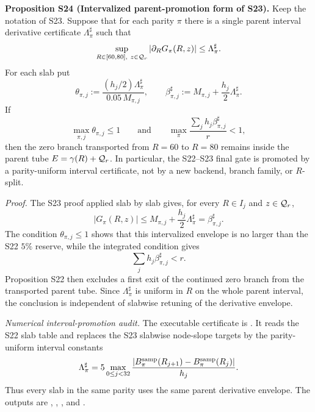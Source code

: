 \documentclass[aps,prd,onecolumn,notitlepage,nofootinbib,superscriptaddress,11pt,floatfix]{revtex4-2}
\begin{document}
\medskip\noindent\textbf{Proposition S24 (Intervalized parent-promotion form of S23).}
Keep the notation of S23.  Suppose that for each parity \(\pi\) there is a
single parent interval derivative certificate \(\Lambda_\pi^\sharp\) such that
\[
\sup_{R\in[60,80],\ z\in{\cal Q}_r}
\left|\partial_R G_\pi(R,z)\right|\le \Lambda_\pi^\sharp .
\]
For each slab put
\[
\theta_{\pi,j}:=
\frac{(h_j/2)\Lambda_\pi^\sharp}{0.05\,M_{\pi,j}},
\qquad
\beta^\sharp_{\pi,j}:=M_{\pi,j}+\frac{h_j}{2}\Lambda_\pi^\sharp .
\]
If
\[
\max_{\pi,j}\theta_{\pi,j}\le1
\qquad\text{and}\qquad
\max_\pi\frac{\sum_j h_j\beta^\sharp_{\pi,j}}{r}<1,
\]
then the zero branch transported from \(R=60\) to \(R=80\) remains inside the
parent tube \(E=\gamma(R)+{\cal Q}_r\).  In particular, the S22--S23 final
gate is promoted by a parity-uniform interval certificate, not by a new
backend, branch family, or \(R\)-split.

\emph{Proof.}
The S23 proof applied slab by slab gives, for every
\(R\in I_j\) and \(z\in{\cal Q}_r\),
\[
|G_\pi(R,z)|
\le M_{\pi,j}+\frac{h_j}{2}\Lambda_\pi^\sharp
=\beta^\sharp_{\pi,j}.
\]
The condition \(\theta_{\pi,j}\le1\) shows that this intervalized envelope is
no larger than the S22 \(5\%\) reserve, while the integrated condition gives
\[
\sum_j h_j\beta^\sharp_{\pi,j}<r.
\]
Proposition S22 then excludes a first exit of the continued zero branch from
the transported parent tube.  Since \(\Lambda_\pi^\sharp\) is uniform in \(R\)
on the whole parent interval, the conclusion is independent of slabwise
retuning of the derivative envelope.

\emph{Numerical interval-promotion audit.}
The executable certificate is
.  It reads the
S22 slab table and replaces the S23 slabwise node-slope targets by the
parity-uniform interval constants
\[
\Lambda_\pi^\sharp
=5\max_{0\le j<32}
\frac{|B^{\rm samp}_\pi(R_{j+1})-B^{\rm samp}_\pi(R_j)|}{h_j}.
\]
Thus every slab in the same parity uses the same parent derivative envelope.
The outputs are
,
,
, and
.
\end{document}
